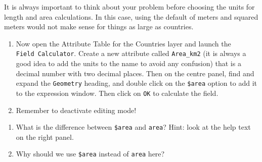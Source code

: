 \documentclass[
  letterpaper,
  DIV=11,
  numbers=noendperiod]{scrreprt}
\begin{document}
It is always important to think about your problem before choosing the
units for length and area calculations. In this case, using the default
of meters and squared meters would not make sense for things as large as
countries.

\begin{enumerate}
\def\labelenumi{(\arabic{enumi})}
\setcounter{enumi}{113}
\item
  Now open the Attribute Table for the Countries layer and launch the
  \texttt{Field\ Calculator}. Create a new attribute called
  \texttt{Area\_km2} (it is always a good idea to add the units to the
  name to avoid any confusion) that is a decimal number with two decimal
  places. Then on the centre panel, find and expand the
  \texttt{Geometry} heading, and double click on the \texttt{\$area}
  option to add it to the expression window. Then click on \texttt{OK}
  to calculate the field.
\item
  Remember to deactivate editing mode!
\end{enumerate}

\begin{tcolorbox}[enhanced jigsaw, coltitle=black, toprule=.15mm, breakable, opacitybacktitle=0.6, left=2mm, colback=white, leftrule=.75mm, rightrule=.15mm, colbacktitle=quarto-callout-important-color!10!white, toptitle=1mm, titlerule=0mm, colframe=quarto-callout-important-color-frame, arc=.35mm, bottomtitle=1mm, opacityback=0, bottomrule=.15mm, title=\textcolor{quarto-callout-important-color}{\faExclamation}\hspace{0.5em}{Stop and Think}]

\begin{enumerate}
\def\labelenumi{\alph{enumi})}
\item
  What is the difference between \texttt{\$area} and \texttt{area}?
  Hint: look at the help text on the right panel.
\item
  Why should we use \texttt{\$area} instead of \texttt{area} here?
\end{enumerate}

\end{tcolorbox}
\end{document}
